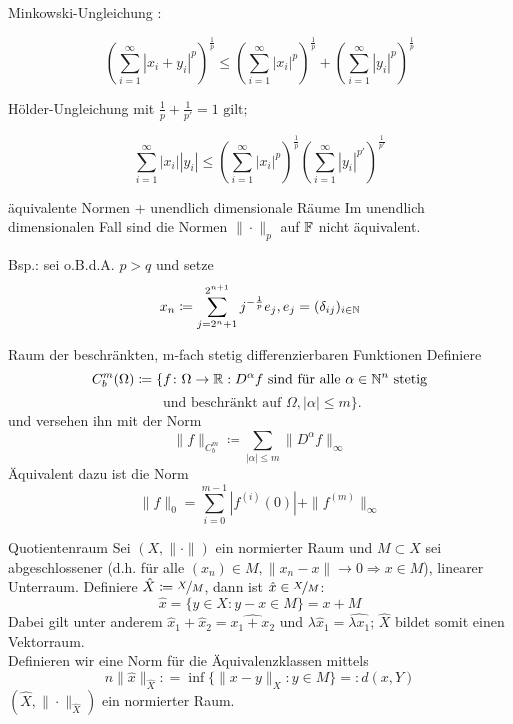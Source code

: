 	\begin{karte}{Minkowski-Ungleichung}
			: 
			
			\[ \left( \sum_{i=1}^{\infty} |x_{i} + y_{i}|^p\right)^{\frac{1}{p}} \leq\left( \sum_{i=1}^{\infty} |x_{i}|^p\right)^{\frac{1}{p}} + \left( \sum_{i=1}^{\infty} |y_{i}|^p\right)^{\frac{1}{p}} \]
	\end{karte}
	
	\begin{karte}{Hölder-Ungleichung}
		 mit $\frac{1}{p} + \frac{1}{p'} = 1 \text{ gilt; }$
		 
		 \[ \sum_{i=1}^{\infty} |x_{i}| |y_{i}| \leq \left( \sum_{i=1}^{\infty} |x_{i}|^{p} \right)^{\frac{1}{p}} \left( \sum_{i=1}^{\infty} |y_{i}|^{p'} \right)^{\frac{1}{p'}} \]	
	\end{karte}
	
	\begin{karte}{äquivalente Normen + unendlich dimensionale Räume}
		Im unendlich dimensionalen Fall sind die Normen $\| \cdot \|_{p}$ auf $\mathbb{F}$ nicht äquivalent.
		
		Bsp.: sei o.B.d.A. $p > q$ und setze 
		\[ x_{n} \coloneqq \sum_{j = 2^{n} + 1}^{2^{n + 1}} j^{-\frac{1}{p}}e_{j}, e_{j} = ( \delta_{ij} )_{i \in \mathbb{N}} \]
	\end{karte}
	
	\begin{karte}{Raum der beschränkten, m-fach stetig differenzierbaren Funktionen}	
	Definiere
		\[ C_{b}^{m}(\Omega) \coloneqq \{ f \colon \Omega \rightarrow \mathbb{R} : D^{\alpha}f \text{ sind für alle } \alpha \in \mathbb{N}^{n} \text{ stetig} \] \[ \text{ und beschränkt auf } \Omega, |\alpha| \leq m \}. \]	
		und versehen ihn mit der Norm 
			\[ \| f \|_{C_{b}^{m}} \coloneqq \sum_{|\alpha| \leq m} \| D^{\alpha}f \|_{\infty} \]
		Äquivalent dazu ist die Norm
		\[ \| f \|_{0} = \sum_{i = 0}^{m - 1} |f^{(i)}(0)| + \| f^{(m)} \|_{\infty} \]
	\end{karte}
	
	\begin{karte}{Quotientenraum}		
	Sei $(X, \| \cdot \|)$ ein normierter Raum und $M \subset X$ sei abgeschlossener (d.h. für alle $(x_{n}) \in M, \| x_{n} - x \| \rightarrow 0 \Rightarrow x \in M$), linearer Unterraum.
	Definiere $\hat X \coloneqq \nicefrac{X}{M}$, dann ist $\hat x \in \nicefrac{X}{M}$:
		\[ \hat x = \{ y \in X: y - x \in M \} = x + M \]
	Dabei gilt unter anderem $\hat x_{1} + \hat x_{2} = \widehat{x_{1} + x_{2}}$ und $\lambda \hat x_{1} = \widehat{\lambda x_{1}}$; $\hat X$ bildet somit einen Vektorraum. \\
	Definieren wir eine Norm für die Äquivalenzklassen mittels
		\[n\| \hat x \|_{\hat X} : = \inf \{ \| x - y \|_{X}: y \in M \} =: d(x, Y) \]
	$(\hat X, \| \cdot \|_{\hat X})$ ein normierter Raum.
	\end{karte}